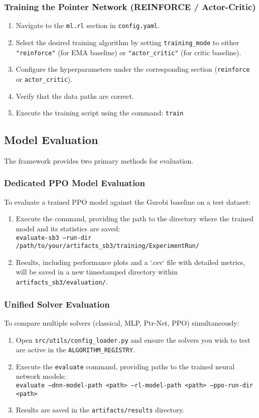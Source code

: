 \subsubsection{Training the Pointer Network (REINFORCE / Actor-Critic)}
\begin{enumerate}
    \item Navigate to the \texttt{ml.rl} section in \texttt{config.yaml}.
    \item Select the desired training algorithm by setting \texttt{training\_mode} to either \texttt{"reinforce"} (for EMA baseline) or \texttt{"actor\_critic"} (for critic baseline).
    \item Configure the hyperparameters under the corresponding section (\texttt{reinforce} or \texttt{actor\_critic}).
    \item Verify that the data paths are correct.
    \item Execute the training script using the command: \texttt{train}
\end{enumerate}

\subsection{Model Evaluation}
The framework provides two primary methods for evaluation.

\subsubsection{Dedicated PPO Model Evaluation}
To evaluate a trained PPO model against the Gurobi baseline on a test dataset:
\begin{enumerate}
    \item Execute the command, providing the path to the directory where the trained model and its statistics are saved: \\
    \texttt{evaluate-sb3 --run-dir /path/to/your/artifacts\_sb3/training/ExperimentRun/}
    \item Results, including performance plots and a `.csv` file with detailed metrics, will be saved in a new timestamped directory within \texttt{artifacts\_sb3/evaluation/}.
\end{enumerate}

\subsubsection{Unified Solver Evaluation}
To compare multiple solvers (classical, MLP, Ptr-Net, PPO) simultaneously:
\begin{enumerate}
    \item Open \texttt{src/utils/config\_loader.py} and ensure the solvers you wish to test are active in the \texttt{ALGORITHM\_REGISTRY}.
    \item Execute the \texttt{evaluate} command, providing paths to the trained neural network models: \\
    \texttt{evaluate --dnn-model-path <path> --rl-model-path <path> --ppo-run-dir <path>}
    \item Results are saved in the \texttt{artifacts/results} directory.
\end{enumerate}